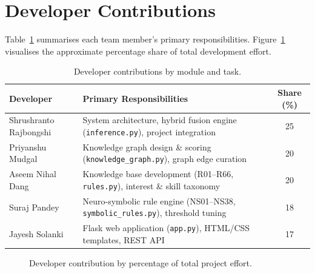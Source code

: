 \documentclass[runningheads]{llncs}
\begin{document}
\section{Developer Contributions}
\label{sec:contributions}

Table~\ref{tab:contrib} summarises each team member's primary responsibilities.
Figure~\ref{fig:contrib-chart} visualises the approximate percentage share of
total development effort.

\begin{table}[htbp]
\centering
\caption{Developer contributions by module and task.}
\label{tab:contrib}
\begin{tabular}{@{}p{3.5cm}p{4.5cm}c@{}}
\toprule
Developer & Primary Responsibilities & Share (\%) \\
\midrule
Shrushranto Rajbongshi & System architecture, hybrid fusion engine (\texttt{inference.py}), project integration & 25 \\
Priyanshu Mudgal       & Knowledge graph design \& scoring (\texttt{knowledge\_graph.py}), graph edge curation & 20 \\
Aseem Nihal Dang       & Knowledge base development (R01--R66, \texttt{rules.py}), interest \& skill taxonomy & 20 \\
Suraj Pandey           & Neuro-symbolic rule engine (NS01--NS38, \texttt{symbolic\_rules.py}), threshold tuning & 18 \\
Jayesh Solanki         & Flask web application (\texttt{app.py}), HTML/CSS templates, REST API & 17 \\
\bottomrule
\end{tabular}
\end{table}

\begin{figure}[htbp]
\centering
{}
\caption{Developer contribution by percentage of total project effort.}
\label{fig:contrib-chart}
\end{figure}
\end{document}

